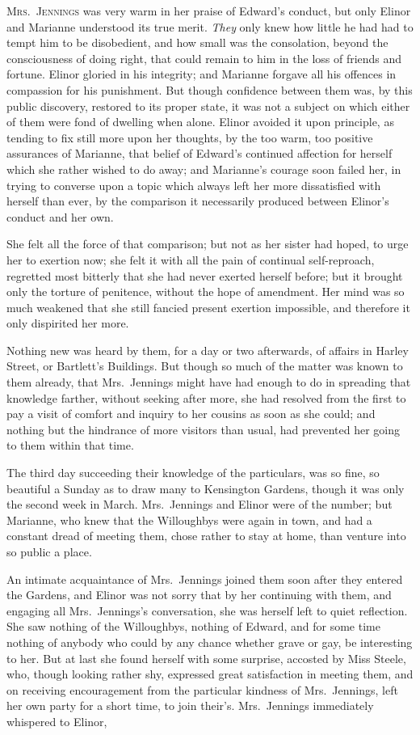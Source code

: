 \documentclass{article}
\newcommand{\gintro}[1]{\textcolor{gcolor}{\textsc{#1}}}
\begin{document}
\gintro{Mrs.\ Jennings} was very warm in her praise of Edward's
conduct, but only Elinor and Marianne understood its
true merit.  \emph{They} only knew how little he had had to tempt
him to be disobedient, and how small was the consolation,
beyond the consciousness of doing right, that could
remain to him in the loss of friends and fortune.
Elinor gloried in his integrity; and Marianne forgave all
his offences in compassion for his punishment.  But though
confidence between them was, by this public discovery,
restored to its proper state, it was not a subject on
which either of them were fond of dwelling when alone.
Elinor avoided it upon principle, as tending to fix still
more upon her thoughts, by the too warm, too positive
assurances of Marianne, that belief of Edward's continued
affection for herself which she rather wished to do away;
and Marianne's courage soon failed her, in trying
to converse upon a topic which always left her more
dissatisfied with herself than ever, by the comparison
it necessarily produced between Elinor's conduct and her own.

She felt all the force of that comparison; but not
as her sister had hoped, to urge her to exertion now;
she felt it with all the pain of continual self-reproach,
regretted most bitterly that she had never exerted
herself before; but it brought only the torture of penitence,
without the hope of amendment.  Her mind was so much weakened
that she still fancied present exertion impossible,
and therefore it only dispirited her more.

Nothing new was heard by them, for a day or two afterwards,
of affairs in Harley Street, or Bartlett's Buildings.
But though so much of the matter was known to them already,
that Mrs.\ Jennings might have had enough to do in spreading
that knowledge farther, without seeking after more,
she had resolved from the first to pay a visit of comfort
and inquiry to her cousins as soon as she could;
and nothing but the hindrance of more visitors than usual,
had prevented her going to them within that time.

The third day succeeding their knowledge of the
particulars, was so fine, so beautiful a Sunday as to draw
many to Kensington Gardens, though it was only the second
week in March.  Mrs.\ Jennings and Elinor were of the number;
but Marianne, who knew that the Willoughbys were again
in town, and had a constant dread of meeting them,
chose rather to stay at home, than venture into so public
a place.

An intimate acquaintance of Mrs.\ Jennings joined
them soon after they entered the Gardens, and Elinor was
not sorry that by her continuing with them, and engaging
all Mrs.\ Jennings's conversation, she was herself left
to quiet reflection.  She saw nothing of the Willoughbys,
nothing of Edward, and for some time nothing of anybody
who could by any chance whether grave or gay, be interesting
to her.  But at last she found herself with some surprise,
accosted by Miss Steele, who, though looking rather shy,
expressed great satisfaction in meeting them, and on receiving
encouragement from the particular kindness of Mrs.\ Jennings,
left her own party for a short time, to join their's.
Mrs.\ Jennings immediately whispered to Elinor,
\end{document}
